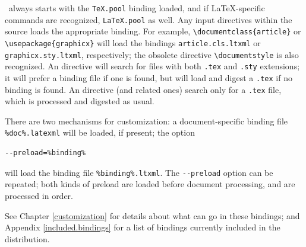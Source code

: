 \documentclass{book}
\newcommand{\shellcode}{\lstinline[style=shell]}
\begin{document}
\LaTeXML\ always starts with the \texttt{TeX.pool} binding loaded,
and if \LaTeX-specific commands are recognized, \texttt{LaTeX.pool} as well.
Any input directives within the source loads the appropriate binding.
For example, \verb|\documentclass{article}| or \verb|\usepackage{graphicx}|
will load the bindings \texttt{article.cls.ltxml} or \texttt{graphicx.sty.ltxml},
respectively; the obsolete directive \verb|\documentstyle|
is also recognized.
An \verb|| directive will search for
files with both \texttt{.tex} and \texttt{.sty} extensions;
it will prefer a binding file if one is found,
but will load and digest a \texttt{.tex} if no binding is found.
An \verb|| directive (and related ones) search only for
a \texttt{.tex} file, which is processed and digested as usual.

There are two mechanisms for customization:
a document-specific binding file \shellcode|%
be loaded, if present;
the option
\begin{lstlisting}[style=shell]
--preload=%binding%
\end{lstlisting}
will load the binding file \shellcode|%
The \shellcode|--preload| option can be repeated;
both kinds of preload are loaded before document processing,
and are processed in order.

See Chapter \ref{customization} for details about what can go in these bindings;
and Appendix \ref{included.bindings} for a list of bindings currently
included in the distribution.


\end{document}
